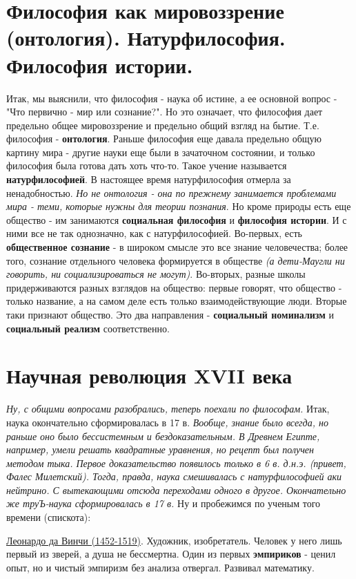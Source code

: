 \section{Философия как мировоззрение (онтология). Натурфилософия. Философия истории.}
Итак, мы выяснили, что философия - наука об истине, а ее основной вопрос - "Что первично - мир или сознание?". Но это означает, что философия дает предельно общее мировоззрение и предельно общий взгляд на бытие. Т.е. философия - \textbf{онтология}. Раньше философия еще давала предельно общую картину мира - другие науки еще были в зачаточном состоянии, и только философия была готова дать хоть что-то. Такое учение называется \textbf{натурфилософией}. В настоящее время натурфилософия отмерла за ненадобностью. \textit{Но не онтология - она по прежнему занимается проблемами мира - теми, которые нужны для теории познания}. Но кроме природы есть еще общество - им занимаются \textbf{социальная философия} и \textbf{философия истории}. И с ними все не так однозначно, как с натурфилософией. Во-первых, есть \textbf{общественное сознание} - в широком смысле это все знание человечества; более того, сознание отдельного человека формируется в обществе \textit{(а дети-Маугли ни говорить, ни социализироваться не могут)}. Во-вторых, разные школы придерживаются разных взглядов на общество: первые говорят, что общество - только название, а на самом деле есть только взаимодействующие люди. Вторые таки признают общество. Это два направления - \textbf{социальный номинализм} и \textbf{социальный реализм} соответственно.

\section{Научная революция XVII века}
\textit{Ну, с общими вопросами разобрались, теперь поехали по философам.} Итак, наука окончательно сформировалась в 17 в. \textit{Вообще, знание было всегда, но раньше оно было бессистемным и бездоказательным. В Древнем Египте, например, умели решать квадратные уравнения, но рецепт был получен методом тыка. Первое доказательство появилось только в 6 в. д.н.э. (привет, Фалес Милетский). Тогда, правда, наука смешивалась с натурфилософией аки нейтрино. С вытекающими отсюда переходами одного в другое. Окончательно же труЪ-наука сформировалась в 17 в.}
Ну и пробежимся по ученым того времени (спискота):

\underline{Леонардо да Винчи (1452-1519)}. Художник, изобретатель. Человек у него лишь первый из зверей, а душа не бессмертна. Один из первых \textbf{эмпириков} - ценил опыт, но и чистый эмпиризм без анализа отвергал. Развивал математику.

